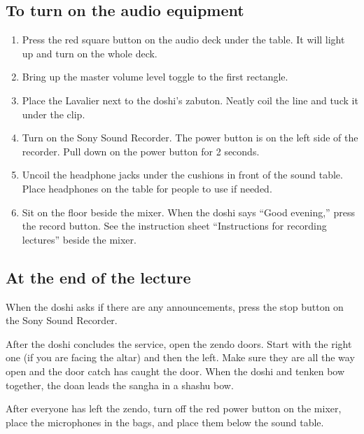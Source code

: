 \documentclass{kdo}
\begin{document}
\subsection*{To turn on the audio equipment}
\begin{enumerate}
\item Press the red square button on the audio deck under the table. It will
light up and turn on the whole deck.
\item Bring up the master volume level toggle to the first rectangle.
\item Place the Lavalier next to the doshi's zabuton. Neatly coil the line and
  tuck it under the clip.
\item Turn on the Sony Sound Recorder. The power button is on the left side of
  the recorder. Pull down on the power button for 2 seconds.
\item Uncoil the headphone jacks under the cushions in front of the sound
  table. Place headphones on the table for people to use if needed.
\item Sit on the floor beside the mixer.  When the doshi says ``Good evening,''
  press the record button. See the instruction sheet ``Instructions for
  recording lectures'' beside the mixer.
\end{enumerate}

\subsection*{At the end of the lecture}
When the doshi asks if there are any announcements, press the stop button on the
Sony Sound Recorder.

After the doshi concludes the service, open the zendo doors. Start with the
right one (if you are facing the altar) and then the left. Make sure they are
all the way open and the door catch has caught the door. When the doshi and
tenken bow together, the doan leads the sangha in a shashu bow.

After everyone has left the zendo, turn off the red power button on the mixer,
place the microphones in the bags, and place them below the sound table.
\end{document}
